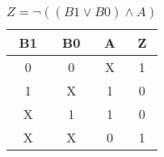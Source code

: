 
\begin{center}
    \begin{table}[h] \caption{\(Z = \lnot ((B1 \lor B0) \land A) \)}
        \begin{center}
            \begin{tabular}{|c|c|c||c|} \hline
            B1 & B0 & A & Z \\ \hline\hline
            0  & 0  & X & 1 \\ \hline
            1  & X  & 1 & 0 \\ \hline
            X  & 1  & 1 & 0 \\ \hline
            X  & X  & 0 & 1 \\ \hline
            \end{tabular}
        \end{center}
    \end{table}
\end{center}
